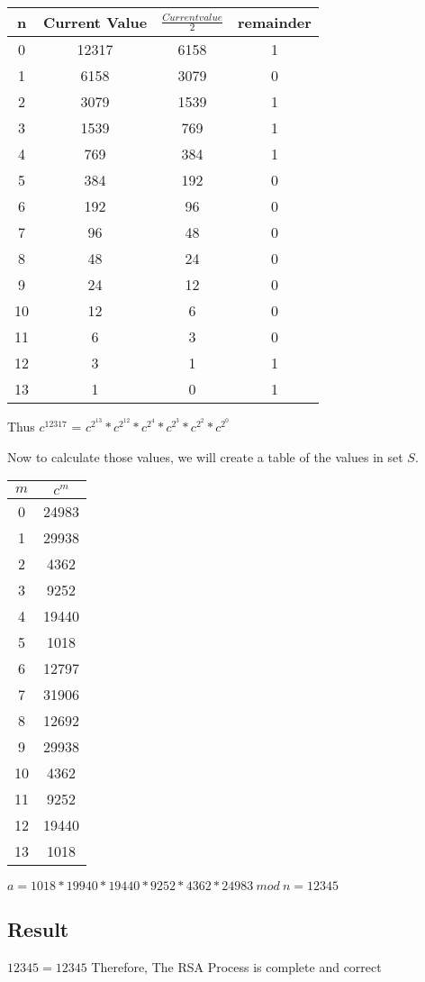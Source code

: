 \documentclass{Algorithms}
\begin{document}
\begin{tabular}{c|c|c|c}
  n & Current Value & $\frac{Current value}{2}$ & remainder\\ \hline
  0 & 12317 &6158 & 1 \\
  1 & 6158 & 3079 & 0 \\
  2 & 3079 & 1539 & 1 \\
  3 & 1539 & 769 & 1 \\
  4 & 769 & 384 & 1 \\
  5 & 384 & 192 & 0 \\
  6 & 192 & 96 & 0 \\
  7 & 96 & 48 & 0 \\
  8 & 48 & 24 & 0 \\
  9 & 24 & 12 & 0 \\
  10 & 12 & 6 & 0 \\
  11 & 6 & 3 & 0 \\
  12 & 3 & 1 & 1 \\
  13 & 1 & 0 & 1 \\
\end{tabular}

Thus $c^{12317}$ = $c^{2^{13}} *  c^{2^{12}} * c^{2^4} * c^{2^3} * c^{2^2} * c^{2^0}$

Now to calculate those values, we will create a table of the values in set $S$.

\begin{tabular}{c|c}
  $m$ & $c^m$ \\ \hline
  0 & 24983 \\
  1 & 29938 \\
  2 & 4362 \\
  3 & 9252 \\
  4 & 19440 \\
  5 & 1018\\
  6 & 12797 \\
  7 & 31906 \\
  8 & 12692 \\
  9 & 29938 \\
  10 & 4362 \\
  11 & 9252 \\
  12 & 19440 \\
  13 & 1018 \\
\end{tabular}

$a = 1018 * 19940 * 19440 * 9252 * 4362 * 24983\ mod\ n = 12345$
\subsection{Result}
$12345 = 12345$ Therefore, The RSA Process is complete and correct
\end{document}
